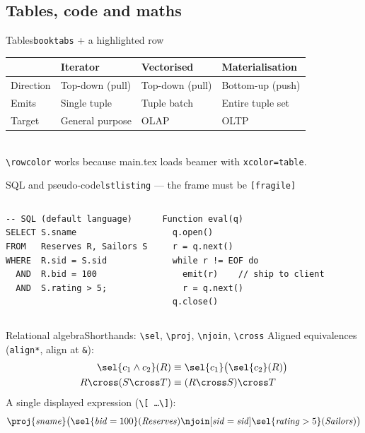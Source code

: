 \subsection{Tables, code and maths}
\begin{frame}{Tables}{\texttt{booktabs} + a highlighted row}
  \centering
  \begin{tabular}{l l l l}
    \toprule
    & \textbf{Iterator} & \textbf{Vectorised} & \textbf{Materialisation} \\
    \midrule
    Direction & Top-down (pull) & Top-down (pull) & Bottom-up (push) \\
    Emits     & Single tuple    & Tuple batch     & Entire tuple set \\
    \rowcolor{vinuRed!8}
    Target    & General purpose & OLAP            & OLTP \\
    \bottomrule
  \end{tabular}\\[2mm]
  {\scriptsize\color{vinuGray} \texttt{\textbackslash rowcolor} works because main.tex loads beamer with \texttt{xcolor=table}.}
\end{frame}

\begin{frame}[fragile]{SQL and pseudo-code}{\texttt{lstlisting} --- the frame must be \texttt{[fragile]}}
  \begin{columns}[T]
\begin{lstlisting}
-- SQL (default language)
SELECT S.sname
FROM   Reserves R, Sailors S
WHERE  R.sid = S.sid
  AND  R.bid = 100
  AND  S.rating > 5;
\end{lstlisting}
\begin{lstlisting}[language=pseudo]
Function eval(q)
  q.open()
  r = q.next()
  while r != EOF do
    emit(r)    // ship to client
    r = q.next()
  q.close()
\end{lstlisting}
  \end{columns}
\end{frame}

\begin{frame}{Relational algebra}{Shorthands: \texttt{\textbackslash sel}, \texttt{\textbackslash proj}, \texttt{\textbackslash njoin}, \texttt{\textbackslash cross}}
  Aligned equivalences (\texttt{align*}, align at \texttt{\&}):
  \begin{align*}
    \sel{c_1 \wedge c_2}(R) &\equiv \sel{c_1}\big(\sel{c_2}(R)\big)\\
    R \cross (S \cross T)   &\equiv (R \cross S) \cross T
  \end{align*}
  A single displayed expression (\texttt{\textbackslash[ \dots \textbackslash]}):
  \[
    \proj{\mathit{sname}}\big(\sel{\mathit{bid}=100}(\mathit{Reserves}) \njoin[\mathit{sid}=\mathit{sid}] \sel{\mathit{rating}>5}(\mathit{Sailors})\big)
  \]
\end{frame}


